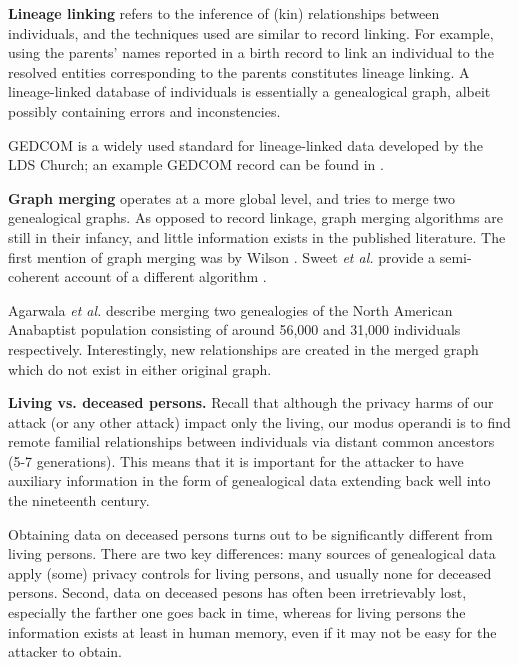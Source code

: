\documentclass{article}
\begin{document}
{\bf Lineage linking} refers to the inference of (kin) relationships between individuals, and the techniques used are similar to record linking. For example, using the parents' names reported in a birth record to link an individual to the resolved entities corresponding to the parents constitutes lineage linking. A lineage-linked database of individuals is essentially a genealogical graph, albeit possibly containing errors and inconstencies.

GEDCOM is a widely used standard for lineage-linked data developed by the LDS Church; an example GEDCOM record can be found in \cite{wp-GEDCOM}.

{\bf Graph merging} operates at a more global level, and tries to merge two genealogical graphs. As opposed to record linkage, graph merging algorithms are still in their infancy, and little information exists in the published literature. 
The first mention of graph merging was by Wilson \cite{wilson-merging}. Sweet {\em et al.} provide a semi-coherent account of a different algorithm \cite{enhanced-merging}.

Agarwala {\em et al.} \cite{anabaptist} describe merging two genealogies of the North American Anabaptist population consisting of around 56,000 and 31,000 individuals respectively. Interestingly, new relationships are created in the merged graph which do not exist in either original graph. 



{\bf Living vs. deceased persons.} Recall that although the privacy harms of our attack (or any other attack) impact only the living, our modus operandi is to find remote familial relationships between individuals via distant common ancestors (5-7 generations). This means that it is important for the attacker to have auxiliary information in the form of genealogical data extending back well into the nineteenth century.

Obtaining data on deceased persons turns out to be significantly different from living persons. There are two key differences: many sources of genealogical data apply (some) privacy controls for living persons, and usually none for deceased persons. Second, data on deceased pesons has often been irretrievably lost, especially the farther one goes back in time, whereas for living persons the information exists at least in human memory, even if it may not be easy for the attacker to obtain.

\end{document}

